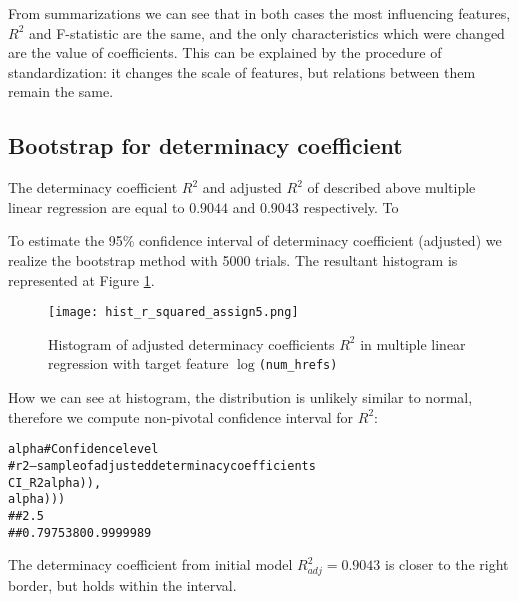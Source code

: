 From summarizations we can see that in both cases the most influencing features, $R^2$ and F-statistic are the same, and the only characteristics which were changed are the value of coefficients. This can be explained by the procedure of standardization: it changes the scale of features, but relations between them remain the same.

\subsection{Bootstrap for determinacy coefficient}
The determinacy coefficient $R^2$ and adjusted $R^2$ of described above multiple linear regression are equal to $0.9044$ and $0.9043$ respectively. To 

To estimate the 95\%  confidence interval of determinacy coefficient (adjusted) we realize the bootstrap method with 5000 trials. The resultant histogram is represented at Figure \ref{fig:hist_r_squared_bootstrap_assign5}. 

\begin{figure}[h!]
 \begin{center}
    \center \texttt{[image: hist\_r\_squared\_assign5.png]}
   \caption{Histogram of adjusted determinacy coefficients $R^2$ in multiple linear regression with target feature \texttt{$\log$(num\_hrefs)}}
   \label{fig:hist_r_squared_bootstrap_assign5}
 \end{center}
\end{figure} 

How we can see at histogram, the distribution is unlikely similar to normal, therefore we compute non-pivotal confidence interval for $R^2$:
\begin{knitrout}
\color{fgcolor}\begin{kframe}
\begin{alltt}
alpha \hlkwb{<-}  # Confidence level
# r2 --- sample of adjusted determinacy coefficients
CI_R2 \hlkwb{<-} \hlstd{(}\hlstd{ = (} \hlopt{-} alpha)\hlopt{/}), 
            \hlstd{= (} \hlopt{+} alpha)\hlopt{/}))
##      2.5%     97.5% 
## 0.7975380 0.9999989 
\end{alltt}
\end{kframe}
\end{knitrout}

The determinacy coefficient from initial model $R^2_{adj} = 0.9043$ is closer to the right border, but holds within the interval. 